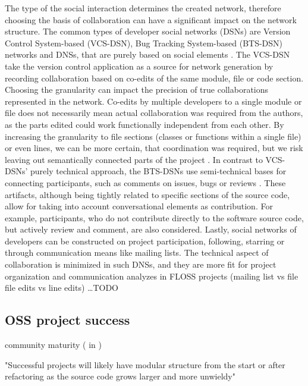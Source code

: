 The type of the social interaction determines the created network, therefore choosing the basis of collaboration can have a significant impact on the network structure. The common types of developer social networks (DSNs) are Version Control System-based (VCS-DSN), Bug Tracking System-based (BTS-DSN) networks and DNSs, that are purely based on social elements \cite{aljemabiEmpiricalStudyEvolution2018}. The VCS-DSN take the version control application as a source for network generation by recording collaboration based on co-edits of the same module, file or code section. Choosing the granularity can impact the precision of true collaborations represented in the network. Co-edits by multiple developers to a single module or file does not necessarily mean actual collaboration was required from the authors, as the parts edited could work functionally independent from each other. By increasing the granularity to file sections (classes or functions within a single file) or even lines, we can be more certain, that coordination was required, but we risk leaving out semantically connected parts of the project \cite{joblinEvolutionaryTrendsDeveloper2017}. In contrast to VCS-DSNs' purely technical approach, the BTS-DSNs use semi-technical bases for connecting participants, such as comments on issues, bugs or reviews \cite{elasriPeripheryCoreTemporal2017}. These artifacts, although being tightly related to specific sections of the source code, allow for taking into account conversational elements as contribution. For example, participants, who do not contribute directly to the software source code, but actively review and comment, are also considered. Lastly, social networks of developers can be constructed on project participation, following, starring or through communication means like mailing lists. The technical aspect of collaboration is minimized in such DNSs, and they are more fit for project organization and communication analyzes in FLOSS projects (mailing list vs file file edits vs line edits) \dots TODO

\subsection{OSS project success}
community maturity (\cite{linBlogCommunityDiscovery2007} in \cite{aljemabiEmpiricalStudyEvolution2018})

"Successful projects will likely have modular structure from the start or after refactoring as the source code grows larger and more unwieldy" \cite{antwerpEvolutionOpenSource2010}

